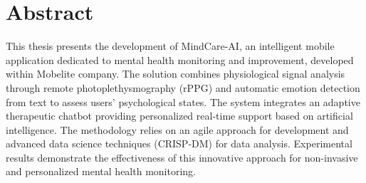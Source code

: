 \chapter*{Abstract} 

This thesis presents the development of MindCare-AI, an intelligent mobile application dedicated to mental health monitoring and improvement, developed within Mobelite company. The solution combines physiological signal analysis through remote photoplethysmography (rPPG) and automatic emotion detection from text to assess users' psychological states. The system integrates an adaptive therapeutic chatbot providing personalized real-time support based on artificial intelligence. The methodology relies on an agile approach for development and advanced data science techniques (CRISP-DM) for data analysis. Experimental results demonstrate the effectiveness of this innovative approach for non-invasive and personalized mental health monitoring.